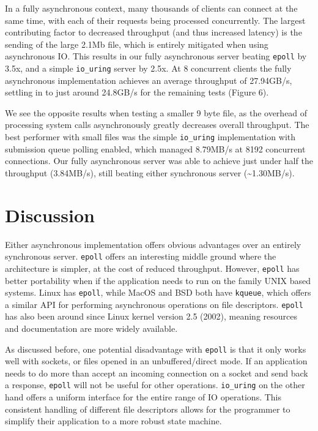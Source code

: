 \documentclass[conference]{IEEEtran}{article}
\begin{document}
In a fully asynchronous context, many thousands of clients can connect at the same time, with each of their requests being processed concurrently. The largest contributing factor to decreased throughput (and thus increased latency) is the sending of the large 2.1Mb file, which is entirely mitigated when using asynchronous IO. This results in our fully asynchronous server beating \texttt{epoll} by 3.5x, and a simple \texttt{io\_uring} server by 2.5x. At 8 concurrent clients the fully asynchronous implementation achieves an average throughput of 27.94GB/s, settling in to just around 24.8GB/s for the remaining tests (Figure 6).

We see the opposite results when testing a smaller 9 byte file, as the overhead of processing system calls asynchronously greatly decreases overall throughput. The best performer with small files was the simple \texttt{io\_uring} implementation with submission queue polling enabled, which managed 8.79MB/s at 8192 concurrent connections. Our fully asynchronous server was able to achieve just under half the throughput (3.84MB/s), still beating either synchronous server (\textasciitilde{}1.30MB/s).

\section{Discussion}
\label{sec:org04da8b8}
Either asynchronous implementation offers obvious advantages over an entirely synchronous server. \texttt{epoll} offers an interesting middle ground where the architecture is simpler, at the cost of reduced throughput. However, \texttt{epoll} has better portability when if the application needs to run on the family UNIX based systems. Linux has \texttt{epoll}, while MacOS and BSD both have \texttt{kqueue}, which offers a similar API for performing asynchronous operations on file descriptors. \texttt{epoll} has also been around since Linux kernel version 2.5 (2002), meaning resources and documentation are more widely available.

As discussed before, one potential disadvantage with \texttt{epoll} is that it only works well with sockets, or files opened in an unbuffered/direct mode. If an application needs to do more than accept an incoming connection on a socket and send back a response, \texttt{epoll} will not be useful for other operations. \texttt{io\_uring} on the other hand offers a uniform interface for the entire range of IO operations. This consistent handling of different file descriptors allows for the programmer to simplify their application to a more robust state machine.
\end{document}

